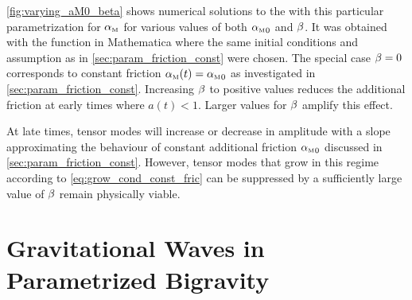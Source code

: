 \documentclass[parskip=half]{scrreprt}
\begin{document}
\autoref{fig:varying_aM0_beta} shows numerical solutions to the  with this particular parametrization for \({\alpha_{\textnormal{\tiny{M}}}}\) for various values of both \({\alpha_{\textnormal{\tiny{M}}}}_0\) and \(\beta\). It was obtained with the  function in Mathematica where the same initial conditions and assumption as in \autoref{sec:param_friction_const} were chosen. The special case \(\beta=0\) corresponds to constant friction \({\alpha_{\textnormal{\tiny{M}}}}(t)={\alpha_{\textnormal{\tiny{M}}}}_0\) as investigated in \autoref{sec:param_friction_const}. Increasing \(\beta\) to positive values reduces the additional friction at early times where \(a(t) < 1\). Larger values for \(\beta\) amplify this effect. 


At late times, tensor modes will increase or decrease in amplitude with a slope approximating the behaviour of constant additional friction \({\alpha_{\textnormal{\tiny{M}}}}_0\) discussed in \autoref{sec:param_friction_const}. However, tensor modes that grow in this regime according to \eqref{eq:grow_cond_const_fric} can be suppressed by a sufficiently large value of \(\beta\) remain physically viable. 


\chapter{Gravitational Waves in Parametrized Bigravity}
\end{document}
